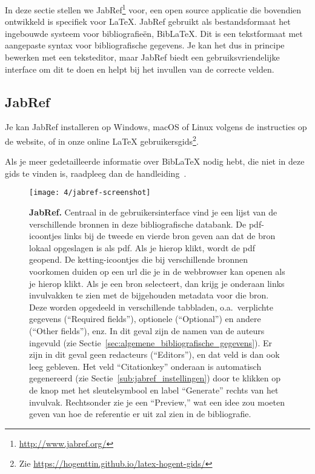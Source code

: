 In deze sectie stellen we JabRef\footnote{\url{http://www.jabref.org/}} voor, een open source applicatie die bovendien ontwikkeld is specifiek voor {\LaTeX}. JabRef gebruikt als bestandsformaat het ingebouwde systeem voor bibliografieën, Bib{\LaTeX}. Dit is een tekstformaat met aangepaste syntax voor bibliografische gegevens. Je kan het dus in principe bewerken met een teksteditor, maar JabRef biedt een gebruiksvriendelijke interface om dit te doen en helpt bij het invullen van de correcte velden.

\subsection{JabRef}%
\label{ssec:jabref}

Je kan JabRef installeren op Windows, macOS of Linux volgens de instructies op de website, of in onze online {\LaTeX} gebruikersgids\footnote{Zie \url{https://hogenttin.github.io/latex-hogent-gids/}}.

Als je meer gedetailleerde informatie over Bib{\LaTeX} nodig hebt, die niet in deze gids te vinden is, raadpleeg dan de handleiding~\autocite{Kime2024}.

\begin{figure}
  \centering
  \texttt{[image: 4/jabref-screenshot]}
  \caption[JabRef]{\label{fig:jabref}\textbf{JabRef.} Centraal in de gebruikersinterface vind je een lijst van de verschillende bronnen in deze bibliografische databank. De pdf-icoontjes links bij de tweede en vierde bron geven aan dat de bron lokaal opgeslagen is als pdf. Als je hierop klikt, wordt de pdf geopend. De ketting-icoontjes die bij verschillende bronnen voorkomen duiden op een url die je in de webbrowser kan openen als je hierop klikt. Als je een bron selecteert, dan krijg je onderaan links invulvakken te zien met de bijgehouden metadata voor die bron. Deze worden opgedeeld in verschillende tabbladen, o.a.~verplichte gegevens (``Required fields''), optionele (``Optional'') en andere (``Other fields''), enz. In dit geval zijn de namen van de auteurs ingevuld (zie Sectie~\ref{sec:algemene_bibliografische_gegevens}). Er zijn in dit geval geen redacteurs (``Editors''), en dat veld is dan ook leeg gebleven. Het veld ``Citationkey'' onderaan is automatisch gegenereerd (zie Sectie~\ref{sub:jabref_instellingen}) door te klikken op de knop met het sleutelsymbool en label ``Generate'' rechts van het invulvak. Rechtsonder zie je een ``Preview,'' wat een idee zou moeten geven van hoe de referentie er uit zal zien in de bibliografie.}

\end{figure}

